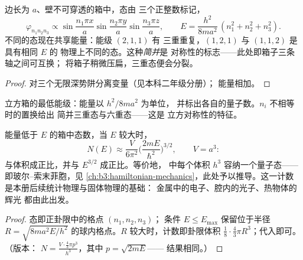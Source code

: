 \begin{proposition}[立方箱及其简并]\label{prop:b3:schrodinger-three-dimensions:box}
边长为 $a$、壁不可穿透的箱中，态由
三个正整数标记，
\[
\varphi_{n_1n_2n_3} \propto
\sin\frac{n_1\pi x}{a}\sin\frac{n_2\pi y}{a}\sin\frac{n_3\pi z}{a} ,
\qquad
E = \frac{h^2}{8ma^2}\,(n_1^2 + n_2^2 + n_3^2) .
\]
不同的态现在共享能量：能级 $(2,1,1)$ 有
三重重复，$(1,2,1)$ 与 $(1,1,2)$ 是具有相同 $E$ 的
物理上不同的态。这种\emph{简并}是
对称性的标志——此处即箱子三条轴之间可互换；
将箱子稍微压扁，三重态便会分裂。
\end{proposition}

\begin{proof}
对三个无限深势阱分离变量（见本科二年级分册）；
能量相加。
\end{proof}

\begin{omfigure}

{\small 立方箱的最低能级：能量以 $h^2/8ma^2$ 为单位，
并标出各自的量子数。$n_i$ 不相等时的置换给出
简并三重态与六重态——这是
立方对称性的特征。}
\end{omfigure}

\begin{proposition}[态的计数]\label{prop:b3:schrodinger-three-dimensions:counting}
能量低于 $E$ 的箱中态数，当 $E$ 较大时，
\[
N(E) \approx \frac{V}{6\pi^2}\Big(\frac{2mE}{\hbar^2}\Big)^{3/2} ,
\qquad V = a^3 :
\]
与体积成正比，并与 $E^{3/2}$ 成正比。等价地，
中每个体积 $h^3$ 容纳一个量子态——
即玻尔–索末菲胞，见
\cref{ch:b3:hamiltonian-mechanics}，此处予以推导。这一计数
是本册后续统计物理与固体物理的基础：
金属中的电子、腔内的光子、热物体的辉光
都由此出发。
\end{proposition}

\begin{proof}
态即正卦限中的格点 $(n_1, n_2, n_3)$；
条件 $E \le E_{\max}$ 保留位于半径 $R =
\sqrt{8ma^2E/h^2}$ 的球内格点。$R$ 较大时，计数即卦限体积
$\tfrac18\cdot\tfrac43\pi R^3$；代入即可。（版本：
$N = \tfrac{V\cdot\frac43\pi p^3}{h^3}$，其中 $p = \sqrt{2mE}$——
结果相同。）
\end{proof}

